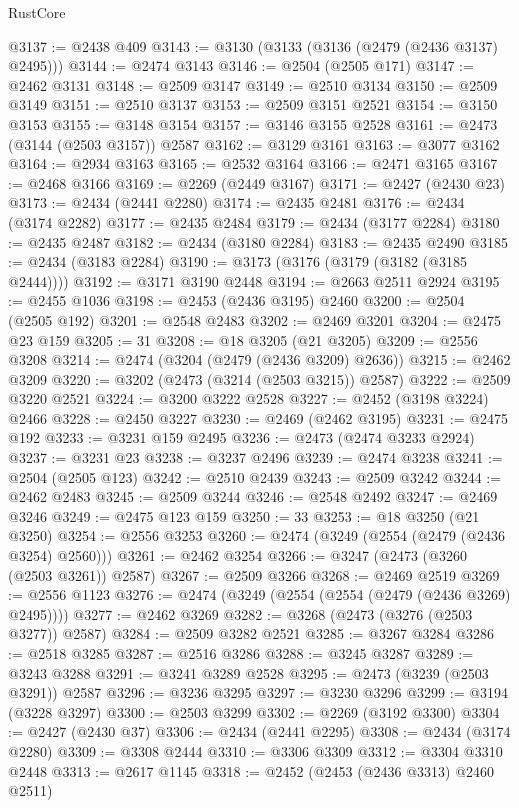 \begin{lexlean}{RustCore}
\begin{coremodule}
@3137 := @2438 @409
@3143 := @3130 (@3133 (@3136 (@2479 (@2436 @3137) @2495)))
@3144 := @2474 @3143
@3146 := @2504 (@2505 @171)
@3147 := @2462 @3131
@3148 := @2509 @3147
@3149 := @2510 @3134
@3150 := @2509 @3149
@3151 := @2510 @3137
@3153 := @2509 @3151 @2521
@3154 := @3150 @3153
@3155 := @3148 @3154
@3157 := @3146 @3155 @2528
@3161 := @2473 (@3144 (@2503 @3157)) @2587
@3162 := @3129 @3161
@3163 := @3077 @3162
@3164 := @2934 @3163
@3165 := @2532 @3164
@3166 := @2471 @3165
@3167 := @2468 @3166
@3169 := @2269 (@2449 @3167)
@3171 := @2427 (@2430 @23)
@3173 := @2434 (@2441 @2280)
@3174 := @2435 @2481
@3176 := @2434 (@3174 @2282)
@3177 := @2435 @2484
@3179 := @2434 (@3177 @2284)
@3180 := @2435 @2487
@3182 := @2434 (@3180 @2284)
@3183 := @2435 @2490
@3185 := @2434 (@3183 @2284)
@3190 := @3173 (@3176 (@3179 (@3182 (@3185 @2444))))
@3192 := @3171 @3190 @2448
@3194 := @2663 @2511 @2924
@3195 := @2455 @1036
@3198 := @2453 (@2436 @3195) @2460
@3200 := @2504 (@2505 @192)
@3201 := @2548 @2483
@3202 := @2469 @3201
@3204 := @2475 @23 @159
@3205 := 31
@3208 := @18 @3205 (@21 @3205)
@3209 := @2556 @3208
@3214 := @2474 (@3204 (@2479 (@2436 @3209) @2636))
@3215 := @2462 @3209
@3220 := @3202 (@2473 (@3214 (@2503 @3215)) @2587)
@3222 := @2509 @3220 @2521
@3224 := @3200 @3222 @2528
@3227 := @2452 (@3198 @3224) @2466
@3228 := @2450 @3227
@3230 := @2469 (@2462 @3195)
@3231 := @2475 @192
@3233 := @3231 @159 @2495
@3236 := @2473 (@2474 @3233 @2924)
@3237 := @3231 @23
@3238 := @3237 @2496
@3239 := @2474 @3238
@3241 := @2504 (@2505 @123)
@3242 := @2510 @2439
@3243 := @2509 @3242
@3244 := @2462 @2483
@3245 := @2509 @3244
@3246 := @2548 @2492
@3247 := @2469 @3246
@3249 := @2475 @123 @159
@3250 := 33
@3253 := @18 @3250 (@21 @3250)
@3254 := @2556 @3253
@3260 := @2474 (@3249 (@2554 (@2479 (@2436 @3254) @2560)))
@3261 := @2462 @3254
@3266 := @3247 (@2473 (@3260 (@2503 @3261)) @2587)
@3267 := @2509 @3266
@3268 := @2469 @2519
@3269 := @2556 @1123
@3276 := @2474 (@3249 (@2554 (@2554 (@2479 (@2436 @3269) @2495))))
@3277 := @2462 @3269
@3282 := @3268 (@2473 (@3276 (@2503 @3277)) @2587)
@3284 := @2509 @3282 @2521
@3285 := @3267 @3284
@3286 := @2518 @3285
@3287 := @2516 @3286
@3288 := @3245 @3287
@3289 := @3243 @3288
@3291 := @3241 @3289 @2528
@3295 := @2473 (@3239 (@2503 @3291)) @2587
@3296 := @3236 @3295
@3297 := @3230 @3296
@3299 := @3194 (@3228 @3297)
@3300 := @2503 @3299
@3302 := @2269 (@3192 @3300)
@3304 := @2427 (@2430 @37)
@3306 := @2434 (@2441 @2295)
@3308 := @2434 (@3174 @2280)
@3309 := @3308 @2444
@3310 := @3306 @3309
@3312 := @3304 @3310 @2448
@3313 := @2617 @1145
@3318 := @2452 (@2453 (@2436 @3313) @2460 @2511)

\end{coremodule}
\end{lexlean}
